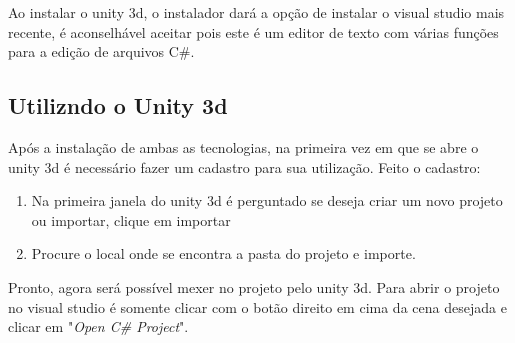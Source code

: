   Ao instalar o unity 3d, o instalador dará
a opção de instalar o visual studio mais recente, é aconselhável aceitar pois este é um editor de texto com várias funções para a edição
de arquivos C\#.

\subsection{Utilizndo o Unity 3d}
  Após a instalação de ambas as tecnologias, na primeira vez em que se abre o unity 3d é necessário fazer um cadastro para sua utilização. Feito
o cadastro:
\begin{enumerate}
  \item Na primeira janela do unity 3d é perguntado se deseja criar um novo projeto ou importar, clique em importar
  \item Procure o local onde se encontra a pasta do projeto e importe.
\end{enumerate}

  Pronto, agora será possível mexer no projeto pelo unity 3d. Para abrir o projeto no visual studio é somente clicar com o botão direito em cima
da cena desejada e clicar em "\textit{Open C\# Project}".
